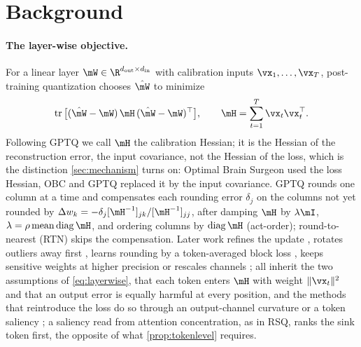 \section{Background}
\label{sec:setup}
\paragraph{The layer-wise objective.}
For a linear layer $\mW\in\R^{d_{\mathrm{out}}\times d_{\mathrm{in}}}$ with calibration inputs $\vx_1,\dots,\vx_T$, post-training quantization chooses $\hat\mW$ to minimize
\begin{equation}
\label{eq:layerwise}
\operatorname{tr}\big[(\hat\mW-\mW)\,\hess\,(\hat\mW-\mW)^\top\big],
\qquad \hess=\sum_{t=1}^{T}\vx_t\vx_t^\top .
\end{equation}
Following GPTQ we call $\hess$ the calibration Hessian; it is the Hessian of the reconstruction error, the input covariance, not the Hessian of the loss, which is the distinction \cref{sec:mechanism} turns on: Optimal Brain Surgeon \citep{lecun1990obd,hassibi1993obs} used the loss Hessian, OBC and GPTQ \citep{frantar2022obc,frantar2023gptq} replaced it by the input covariance.
GPTQ rounds one column at a time and compensates each rounding error $\delta_j$ on the columns not yet rounded by $\Delta w_k=-\delta_j[\hess^{-1}]_{jk}/[\hess^{-1}]_{jj}$, after damping $\hess$ by $\lambda\mI$, $\lambda=\rho\operatorname{mean}\operatorname{diag}\hess$, and ordering columns by $\operatorname{diag}\hess$ (act-order); round-to-nearest (RTN) skips the compensation.
Later work refines the update \citep{li2025gptaq,chen2026babai,zhang2026heroq,kim2026dashq}, rotates outliers away first \citep{chee2023quip,ashkboos2024quarot}, learns rounding by a token-averaged block loss \citep{nagel2020adaround,li2021brecq,shao2024omniquant,cheng2024autoround}, keeps sensitive weights at higher precision \citep{dettmers2024spqr,kim2024squeezellm,xiao2025tacq} or rescales channels \citep{lin2024awq}; all inherit the two assumptions of \cref{eq:layerwise}, that each token enters $\hess$ with weight $\|\vx_t\|^2$ and that an output error is equally harmful at every position, and the methods that reintroduce the loss do so through an output-channel curvature \citep{lee2026kronq,kim2025guidedquant} or a token saliency \citep{xue2025vlmq,sung2025rsq}; a saliency read from attention concentration, as in RSQ, ranks the sink token first, the opposite of what \cref{prop:tokenlevel} requires.

